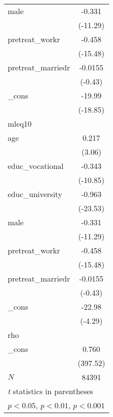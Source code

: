 {\begin{tabular}{l*{1}{c}}
male        &      -0.331\sym{***}\\
            &    (-11.29)         \\
[1em]
pretreat\_workr&      -0.458\sym{***}\\
            &    (-15.48)         \\
[1em]
pretreat\_marriedr&     -0.0155         \\
            &     (-0.43)         \\
[1em]
\_cons      &      -19.99\sym{***}\\
            &    (-18.85)         \\
\hline
mleq10      &                     \\
age         &       0.217\sym{**} \\
            &      (3.06)         \\
[1em]
educ\_vocational&      -0.343\sym{***}\\
            &    (-10.85)         \\
[1em]
educ\_university&      -0.963\sym{***}\\
            &    (-23.53)         \\
[1em]
male        &      -0.331\sym{***}\\
            &    (-11.29)         \\
[1em]
pretreat\_workr&      -0.458\sym{***}\\
            &    (-15.48)         \\
[1em]
pretreat\_marriedr&     -0.0155         \\
            &     (-0.43)         \\
[1em]
\_cons      &      -22.98\sym{***}\\
            &     (-4.29)         \\
\hline
rho         &                     \\
\_cons      &       0.760\sym{***}\\
            &    (397.52)         \\
\hline
\(N\)       &       84391         \\
\hline\hline
\multicolumn{2}{l}{\footnotesize \textit{t} statistics in parentheses}\\
\multicolumn{2}{l}{\footnotesize \sym{*} \(p<0.05\), \sym{**} \(p<0.01\), \sym{***} \(p<0.001\)}\\
\end{tabular}
}
